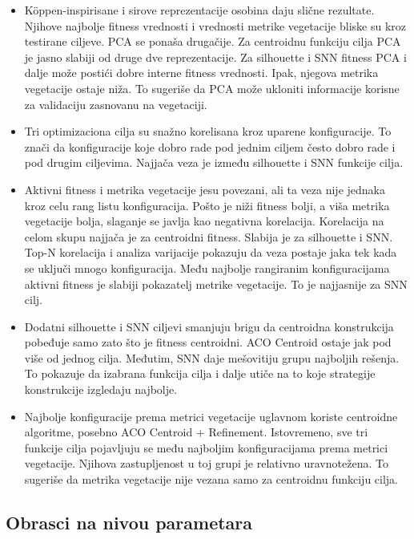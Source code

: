 \documentclass[11pt]{article}
\begin{document}
\begin{itemize}
  \item Köppen-inspirisane i sirove reprezentacije osobina daju slične rezultate. Njihove najbolje fitness vrednosti i vrednosti metrike vegetacije bliske su kroz testirane ciljeve. PCA se ponaša drugačije. Za centroidnu funkciju cilja PCA je jasno slabiji od druge dve reprezentacije. Za silhouette i SNN fitness PCA i dalje može postići dobre interne fitness vrednosti. Ipak, njegova metrika vegetacije ostaje niža. To sugeriše da PCA može ukloniti informacije korisne za validaciju zasnovanu na vegetaciji.
  \item Tri optimizaciona cilja su snažno korelisana kroz uparene konfiguracije. To znači da konfiguracije koje dobro rade pod jednim ciljem često dobro rade i pod drugim ciljevima. Najjača veza je između silhouette i SNN funkcije cilja.
  \item Aktivni fitness i metrika vegetacije jesu povezani, ali ta veza nije jednaka kroz celu rang listu konfiguracija. Pošto je niži fitness bolji, a viša metrika vegetacije bolja, slaganje se javlja kao negativna korelacija. Korelacija na celom skupu najjača je za centroidni fitness. Slabija je za silhouette i SNN. Top-N korelacija i analiza varijacije pokazuju da veza postaje jaka tek kada se uključi mnogo konfiguracija. Među najbolje rangiranim konfiguracijama aktivni fitness je slabiji pokazatelj metrike vegetacije. To je najjasnije za SNN cilj.
  \item Dodatni silhouette i SNN ciljevi smanjuju brigu da centroidna konstrukcija pobeđuje samo zato što je fitness centroidni. ACO Centroid ostaje jak pod više od jednog cilja. Međutim, SNN daje mešovitiju grupu najboljih rešenja. To pokazuje da izabrana funkcija cilja i dalje utiče na to koje strategije konstrukcije izgledaju najbolje.
  \item Najbolje konfiguracije prema metrici vegetacije uglavnom koriste centroidne algoritme, posebno ACO Centroid + Refinement. Istovremeno, sve tri funkcije cilja pojavljuju se među najboljim konfiguracijama prema metrici vegetacije. Njihova zastupljenost u toj grupi je relativno uravnotežena. To sugeriše da metrika vegetacije nije vezana samo za centroidnu funkciju cilja.
\end{itemize}

\subsection{Obrasci na nivou parametara}
\end{document}

